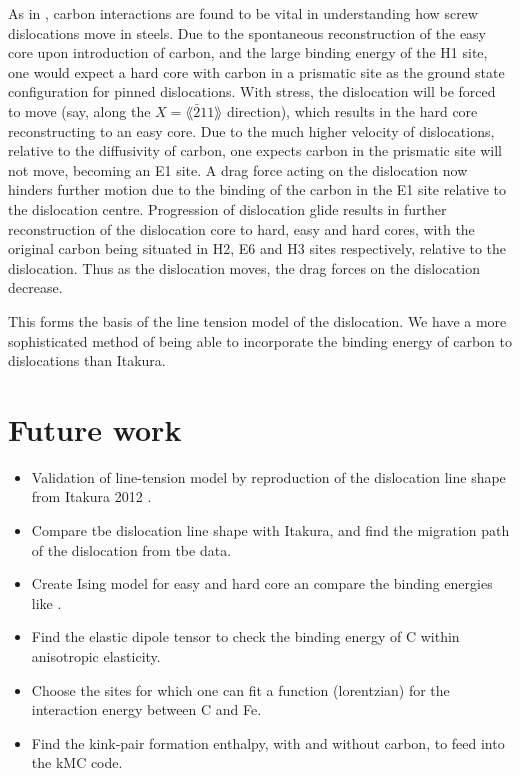 \documentclass[a4paper,11pt]{article}
\begin{document}
As in \cite{Lthi2019}, carbon interactions are found to be vital in understanding how screw
dislocations move in steels. Due to the spontaneous reconstruction of the easy core upon
introduction of carbon, and the large binding energy of the H1 site, one would expect a hard
core with carbon in a prismatic site as the ground state configuration for pinned
dislocations. With stress, the dislocation will be forced to move (say, along the \(X =
    \lang\bar{2}11\rang\) direction), which results in the hard core reconstructing to an easy core. Due to
the much higher velocity of dislocations, relative to the diffusivity of carbon, one expects
carbon in the prismatic site will not move, becoming an E1 site. A drag force acting on the
dislocation now hinders further motion due to the binding of the carbon in the E1
site relative to the dislocation centre. Progression of dislocation glide results in further
reconstruction of the dislocation core to hard, easy and hard cores, with the original carbon being situated in H2, E6 and H3
sites respectively, relative to the dislocation. Thus as the dislocation moves, the drag forces
on the dislocation decrease.



This forms the basis of the line tension model of the dislocation. We have a more sophisticated
method of being able to incorporate the binding energy of carbon to dislocations than Itakura. 



\section{Future work}
\label{sec:org6264f0a}

\begin{itemize}
\item Validation of line-tension model by reproduction of the dislocation line shape from
Itakura 2012 \cite{Itakura2012}.
\item Compare tbe dislocation line shape with Itakura, and find the migration path of the dislocation from tbe data.
\item\relax [Optional] Create Ising model for easy and hard core an compare the binding energies like \cite{Lthi2019}.
\item\relax [Optional] Find the elastic dipole tensor to check the binding energy of C within anisotropic elasticity.
\item Choose the sites for which one can fit a function (lorentzian) for the interaction energy between C and Fe.
\item Find the kink-pair formation enthalpy, with and without carbon, to feed into the kMC
code.
\end{itemize}
\end{document}
